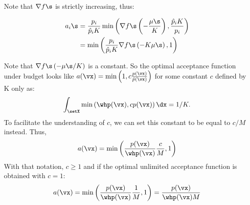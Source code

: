 \documentclass[twoside]{article}
\begin{document}
Note that $\nabla f\s$ is strictly increasing, thus:

\begin{align*}
	a_{i}\s & =\frac{p_i }{\hat{p}_{i}K}\min\left(\nabla f\s\left(-\frac{\mu\s}{K}\right),\frac{\hat{p}_{i}K}{p_i}\right)\\
 & =\min\left(\frac{p_i }{\hat{p}_{i}K}\nabla f\s\left(-K\mu\s\right),1\right)
\end{align*}

Note that $\nabla f\s\left(-\mu\s/K\right)$ is a constant.
So the optimal acceptance function under budget looks like $a(\vx)=\min\left(1,c\frac{p(\vx)}{\hat{p}(\vx)}\right)$
for some constant $c$ defined by K only as:
\begin{align}
	\int_{\setX} \min\left(\whp(\vx),cp(\vx)\right)\dx = 1/K.
\end{align}
To facilitate the understanding of $c$, we can set this constant to be equal to $c/M$ instead. Thus,
\begin{align}
a(\vx) = \min\left(\frac{p(\vx)}{\whp(\vx)}\frac{c}{M}, 1\right)
\end{align}
With that notation, $c\geq1$ and if the optimal unlimited acceptance function is obtained with $c=1$:  
\begin{align}
	a(\vx) = \min\left(\frac{p(\vx)}{\whp(\vx)}\frac{1}{M}, 1\right) = \frac{p(\vx)}{\whp(\vx)M}
\end{align}
\end{document}
